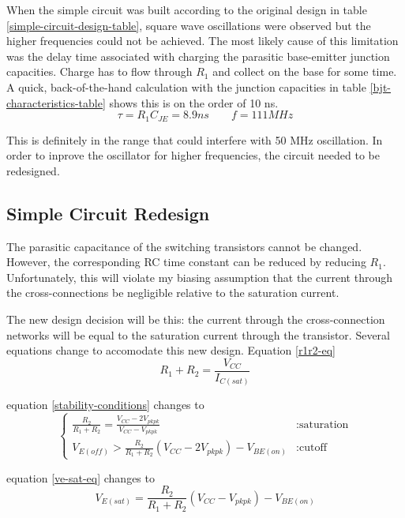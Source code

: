 \documentclass[titlepage, letterpaper, 10.5pt]{article}
\begin{document}
When the simple circuit was built according to the original design in table
\ref{simple-circuit-design-table},
square wave oscillations were observed but the higher frequencies could not be achieved.
The most likely cause of this limitation was the delay time associated with charging the
parasitic base-emitter junction capacities. Charge has to flow through $R_{1}$ and collect
on the base for some time.
A quick, back-of-the-hand calculation with the junction capacities in table \ref{bjt-characteristics-table}
shows this is on the order of 10 ns.
\begin{equation*}
\tau=R_{1}C_{JE}=8.9ns\quad\quad f=111MHz
\end{equation*}

This is definitely in the range that could interfere with 50 MHz oscillation.
In order to inprove the oscillator for higher frequencies, the circuit needed to be redesigned.

\subsection{Simple Circuit Redesign}

The parasitic capacitance of the switching transistors cannot be changed. However,
the corresponding RC time constant can be reduced by reducing $R_{1}$. Unfortunately,
this will violate my biasing assumption that the current through the cross-connections
be negligible relative to the saturation current.

The new design decision will be this: the current through the cross-connection networks
will be equal to the saturation current through the transistor. Several equations change
to accomodate this new design. Equation \ref{r1r2-eq}
\begin{equation}
R_{1}+R_{2}=\frac{V_{CC}}{I_{C(sat)}}
\label{redesigned-r1r2-eq}
\end{equation}

equation \ref{stability-conditions} changes to
\begin{equation}
\left\{
\begin{array}{lr}
\frac{R_{2}}{R_{1}+R_{2}}=\frac{V_{CC}-2V_{pkpk}}{V_{CC}-V_{pkpk}}	& : \textrm{saturation}	\\
V_{E(off)}>\frac{R_{2}}{R_{1}+R_{2}}(V_{CC}-2V_{pkpk})-V_{BE(on)}	& : \textrm{cutoff}
\end{array}
\right.
\label{redesigned-stability-eq}
\end{equation}

equation \ref{ve-sat-eq} changes to
\begin{equation}
V_{E(sat)}=\frac{R_{2}}{R_{1}+R_{2}}(V_{CC}-V_{pkpk})-V_{BE(on)}
\label{redesigned-ve-sat-eq}
\end{equation}
\end{document}
